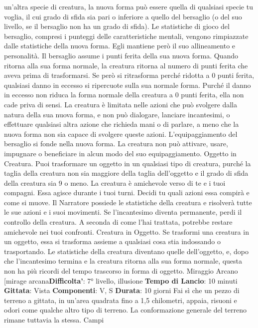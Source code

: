 \begin{multicols}{2}
un’altra specie di creatura, la nuova forma può essere
quella di qualsiasi specie tu voglia, il cui grado di sfida
sia pari o inferiore a quello del bersaglio (o del suo
livello, se il bersaglio non ha un grado di sfida). Le
statistiche di gioco del bersaglio, compresi i punteggi
delle caratteristiche mentali, vengono rimpiazzate dalle
statistiche della nuova forma. Egli mantiene però il suo
allineamento e personalità.
Il bersaglio assume i punti ferita della sua nuova forma.
Quando ritorna alla sua forma normale, la creatura
ritorna al numero di punti ferita che aveva prima di
trasformarsi. Se però si ritrasforma perché ridotta a 0
punti ferita, qualsiasi danno in eccesso si ripercuote
sulla sua normale forma. Purché il danno in eccesso
non riduca la forma normale della creatura a 0 punti
ferita, ella non cade priva di sensi.
La creatura è limitata nelle azioni che può svolgere
dalla natura della sua nuova forma, e non può
dialogare, lanciare incantesimi, o effettuare qualsiasi
altra azione che richieda mani o di parlare, a meno che
la nuova forma non sia capace di svolgere queste
azioni.
L’equipaggiamento del bersaglio si fonde nella nuova
forma. La creatura non può attivare, usare, impugnare o
beneficiare in alcun modo del suo equipaggiamento.
Oggetto in Creatura. Puoi trasformare un oggetto in un
qualsiasi tipo di creatura, purché la taglia della creatura
non sia maggiore della taglia dell’oggetto e il grado di
sfida della creatura sia 9 o meno. La creatura è
amichevole verso di te e i tuoi compagni. Essa agisce
durante i tuoi turni. Decidi tu quali azioni essa compirà e
come si muove. Il Narratore possiede le statistiche della
creatura e risolverà tutte le sue azioni e i suoi
movimenti.
Se l’incantesimo diventa permanente, perdi il controllo
della creatura. A seconda di come l’hai trattata,
potrebbe restare amichevole nei tuoi confronti.
Creatura in Oggetto. Se trasformi una creatura in un
oggetto, essa si trasforma assieme a qualsiasi cosa stia
indossando o trasportando. Le statistiche della creatura
diventano quelle dell’oggetto, e, dopo che l’incantesimo
termina e la creatura ritorna alla sua forma normale,
questa non ha più ricordi del tempo trascorso in forma
di oggetto.
Miraggio Arcano
[mirage arcana\textbf{Difficolta'}:
7° livello, illusione
\textbf{Tempo di Lancio}: 10 minuti
\textbf{Gittata}: Vista
\textbf{Componenti}: V, S
\textbf{Durata}: 10 giorni
Fai sì che un pezzo di terreno a gittata, in un’area
quadrata fino a 1,5 chilometri, appaia, risuoni e odori
come qualche altro tipo di terreno. La conformazione
generale del terreno rimane tuttavia la stessa. Campi

\end{multicols}
